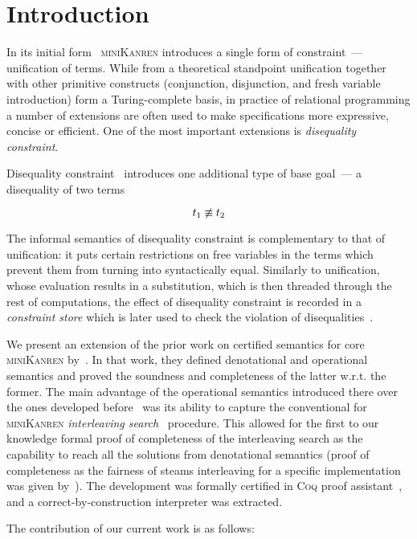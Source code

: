 \section{Introduction}

In its initial form~\cite{TRS,MicroKanren} \textsc{miniKanren} introduces a single
form of constraint~--- unification of terms. While from a theoretical standpoint unification together with other primitive constructs (conjunction, disjunction, and
fresh variable introduction) form a Turing-complete basis, in practice of relational programming a number of extensions are often used to make specifications more
expressive, concise or efficient. One of the most important extensions is \emph{disequality constraint}.

Disequality constraint~\cite{Disunification} introduces one additional type of base goal~--- a disequality of two terms

\[
t_1 \not\equiv t_2
\]

The informal semantics of disequality constraint is complementary to that of unification: it puts certain restrictions on free variables in the terms which
prevent them from turning into syntactically equal. Similarly to unification, whose evaluation results in a substitution, which is then threaded through
the rest of computations, the effect of disequality constraint is recorded in a \emph{constraint store} which is later used to check the violation of
disequalities~\cite{CKanren}.

We present an extension of the prior work on certified semantics for core \textsc{miniKanren} by~\citet{CertifiedSemantics}. In that work, they
defined denotational and operational semantics and proved the soundness and completeness of the latter w.r.t. the former. 
The main advantage of the operational semantics introduced there over the ones developed before~\cite{MechanisingMiniKanren, RelConversion, DivTest}
was its ability to capture the conventional for \textsc{miniKanren} \emph{interleaving search}~\cite{Search} procedure.
This allowed for the first to our knowledge formal proof of completeness of the interleaving search
as the capability to reach all the solutions from denotational semantics
(proof of completeness as the fairness of steams interleaving for a specific implementation was given by~\citet{SmallEmbedding}).
The development was formally certified in \textsc{Coq} proof assistant~\cite{Coq}, and a correct-by-construction interpreter was extracted.

The contribution of our current work is as follows:

